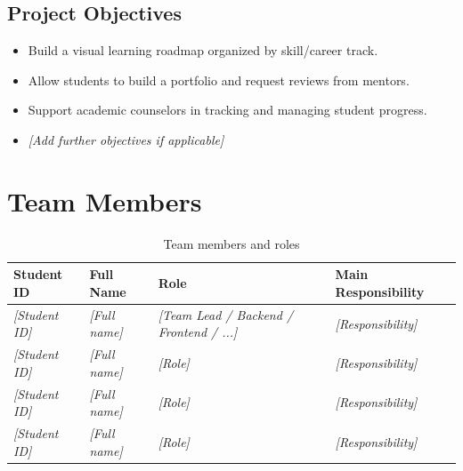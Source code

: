 \documentclass[12pt,a4paper]{report}
\begin{document}

\section{Project Objectives}
\begin{itemize}[leftmargin=1.2cm]
    \item Build a visual learning roadmap organized by skill/career track.
    \item Allow students to build a portfolio and request reviews from mentors.
    \item Support academic counselors in tracking and managing student progress.
    \item \textit{[Add further objectives if applicable]}
\end{itemize}

\chapter{Team Members}

\begin{table}[H]
    \centering
    \caption{Team members and roles}
    \label{tab:members}
    \begin{tabularx}{\textwidth}{|l|X|X|X|}
        \hline
        \textbf{Student ID} & \textbf{Full Name} & \textbf{Role} & \textbf{Main Responsibility} \\
        \hline
        \textit{[Student ID]} & \textit{[Full name]} & \textit{[Team Lead / Backend / Frontend / ...]} & \textit{[Responsibility]} \\
        \hline
        \textit{[Student ID]} & \textit{[Full name]} & \textit{[Role]} & \textit{[Responsibility]} \\
        \hline
        \textit{[Student ID]} & \textit{[Full name]} & \textit{[Role]} & \textit{[Responsibility]} \\
        \hline
        \textit{[Student ID]} & \textit{[Full name]} & \textit{[Role]} & \textit{[Responsibility]} \\
        \hline
    \end{tabularx}
\end{table}

\end{document}
